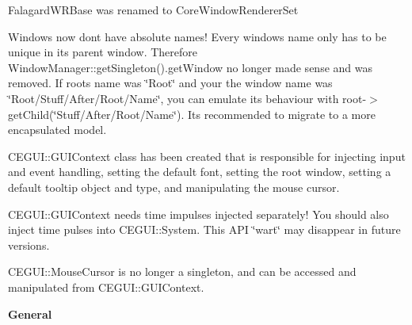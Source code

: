 \begin{DoxyItemize}
\item Falagard\+W\+R\+Base was renamed to Core\+Window\+Renderer\+Set
\item Windows now don\textquotesingle{}t have absolute names! Every window\textquotesingle{}s name only has to be unique in it\textquotesingle{}s parent window. Therefore Window\+Manager\+::get\+Singleton().get\+Window no longer made sense and was removed. If root\textquotesingle{}s name was \char`\"{}\+Root\char`\"{} and your the window name was \char`\"{}\+Root/\+Stuff/\+After/\+Root/\+Name\char`\"{}, you can emulate its behaviour with root-\/$>$get\+Child(\char`\"{}\+Stuff/\+After/\+Root/\+Name\char`\"{}). It\textquotesingle{}s recommended to migrate to a more encapsulated model.
\item C\+E\+G\+U\+I\+::\+G\+U\+I\+Context class has been created that is responsible for injecting input and event handling, setting the default font, setting the root window, setting a default tooltip object and type, and manipulating the mouse cursor.
\item C\+E\+G\+U\+I\+::\+G\+U\+I\+Context needs time impulses injected separately! You should also inject time pulses into C\+E\+G\+U\+I\+::\+System. This A\+PI \char`\"{}wart\char`\"{} may disappear in future versions.
\item C\+E\+G\+U\+I\+::\+Mouse\+Cursor is no longer a singleton, and can be accessed and manipulated from C\+E\+G\+U\+I\+::\+G\+U\+I\+Context.
\end{DoxyItemize}

{\bfseries{ General }}


